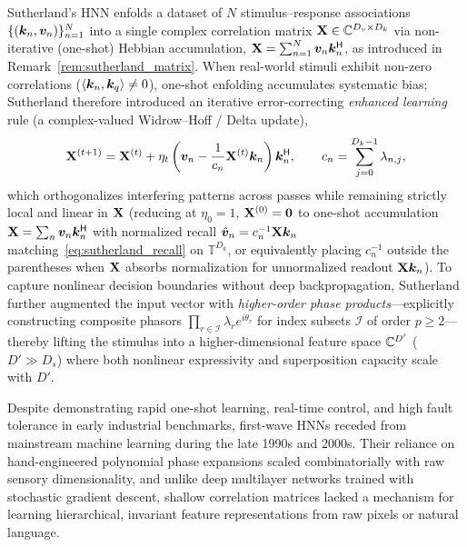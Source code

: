 Sutherland's HNN enfolds a dataset of $N$ stimulus--response associations $\{(\boldsymbol{k}_n, \boldsymbol{v}_n)\}_{n=1}^N$ into a single complex correlation matrix $\mathbf{X} \in \mathbb{C}^{D_v \times D_k}$ via non-iterative (one-shot) Hebbian accumulation, $\mathbf{X} = \sum_{n=1}^{N} \boldsymbol{v}_n \boldsymbol{k}_n^{\mathsf{H}}$, as introduced in Remark~\ref{rem:sutherland_matrix}.
When real-world stimuli exhibit non-zero correlations ($\left\langle \boldsymbol{k}_n, \boldsymbol{k}_q \right\rangle \neq 0$), one-shot enfolding accumulates systematic bias; Sutherland therefore introduced an iterative error-correcting \emph{enhanced learning} rule (a complex-valued Widrow--Hoff / Delta update),
\begin{equation}\label{eq:sutherland_delta}
    \mathbf{X}^{(t+1)} = \mathbf{X}^{(t)} + \eta_t\left(\boldsymbol{v}_n - \frac{1}{c_n}\mathbf{X}^{(t)}\boldsymbol{k}_n\right)\boldsymbol{k}_n^{\mathsf{H}},
    \qquad c_n = \sum_{j=0}^{D_k - 1} \lambda_{n,j},
\end{equation}
which orthogonalizes interfering patterns across passes while remaining strictly local and linear in $\mathbf{X}$ (reducing at $\eta_0 = 1$, $\mathbf{X}^{(0)} = \mathbf{0}$ to one-shot accumulation $\mathbf{X} = \sum_n \boldsymbol{v}_n \boldsymbol{k}_n^{\mathsf{H}}$ with normalized recall $\hat{\boldsymbol{v}}_n = c_n^{-1}\mathbf{X}\boldsymbol{k}_n$ matching~\eqref{eq:sutherland_recall} on $\mathbb{T}^{D_k}$, or equivalently placing $c_n^{-1}$ outside the parentheses when $\mathbf{X}$ absorbs normalization for unnormalized readout $\mathbf{X}\boldsymbol{k}_n$).
To capture nonlinear decision boundaries without deep backpropagation, Sutherland further augmented the input vector with \emph{higher-order phase products}---explicitly constructing composite phasors $\prod_{r \in \mathcal{I}} \lambda_r e^{i\theta_r}$ for index subsets $\mathcal{I}$ of order $p \ge 2$---thereby lifting the stimulus into a higher-dimensional feature space $\mathbb{C}^{D'}$ ($D' \gg D_s$) where both nonlinear expressivity and superposition capacity scale with $D'$.

Despite demonstrating rapid one-shot learning, real-time control, and high fault tolerance in early industrial benchmarks, first-wave HNNs receded from mainstream machine learning during the late 1990s and 2000s.
Their reliance on hand-engineered polynomial phase expansions scaled combinatorially with raw sensory dimensionality, and unlike deep multilayer networks trained with stochastic gradient descent, shallow correlation matrices lacked a mechanism for learning hierarchical, invariant feature representations from raw pixels or natural language.

